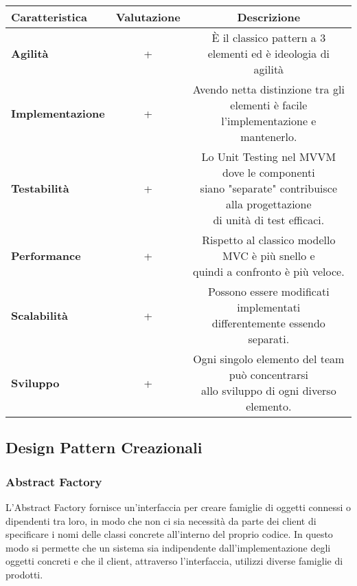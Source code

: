 {{{\begin{itemize}
				\small %
				{\renewcommand\arraystretch{1.2} %
					\begin{center} \begin{tabular}{|l|c|c|}
						\hline
						{\textbf{Caratteristica}}&{\textbf{Valutazione}}&{\textbf{Descrizione}}\\
						\hline
						\textbf{Agilità} & + & È il classico pattern a 3 elementi ed è ideologia di agilità \\
						\hline
						\textbf{Implementazione} & + &  \minitab[c]{Avendo netta distinzione tra gli elementi è facile\\ l'implementazione e mantenerlo.}\\
						\hline
						\textbf{Testabilità} & + &  \minitab[c]{Lo Unit Testing nel MVVM dove le componenti\\ siano "separate" contribuisce alla progettazione\\ di unità di test efficaci.}\\
						\hline
						\textbf{Performance} & + &  \minitab[c]{Rispetto al classico modello MVC è più snello e\\ quindi a confronto è più veloce.}\\
						\hline
						\textbf{Scalabilità} & + &  \minitab[c]{Possono essere modificati implementati\\differentemente essendo separati.} \\
						\hline
						\textbf{Sviluppo} & + &  \minitab[c]{Ogni singolo elemento del team può concentrarsi\\allo sviluppo di ogni diverso elemento.} \\
						\hline
					\end{tabular} \end{center}
				}
			\end{itemize}
		}
	}
	\subsection{Design Pattern Creazionali}{
		\subsubsection{Abstract Factory}{
			L'Abstract Factory fornisce un'interfaccia per creare famiglie di oggetti connessi o dipendenti tra loro, in modo che non ci sia necessità da parte dei client di specificare i nomi delle classi concrete all'interno del proprio codice.
			In questo modo si permette che un sistema sia indipendente dall'implementazione degli oggetti concreti e che il client, attraverso l'interfaccia, utilizzi diverse famiglie di prodotti.
			
}}}
